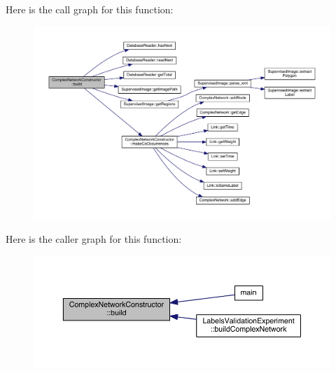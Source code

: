 Here is the call graph for this function\+:\nopagebreak
\begin{figure}[H]
\begin{center}
\leavevmode
\includegraphics[width=350pt]{class_complex_network_constructor_a19d313488e2c19172e362b521f53e329_cgraph}
\end{center}
\end{figure}




Here is the caller graph for this function\+:\nopagebreak
\begin{figure}[H]
\begin{center}
\leavevmode
\includegraphics[width=350pt]{class_complex_network_constructor_a19d313488e2c19172e362b521f53e329_icgraph}
\end{center}
\end{figure}


